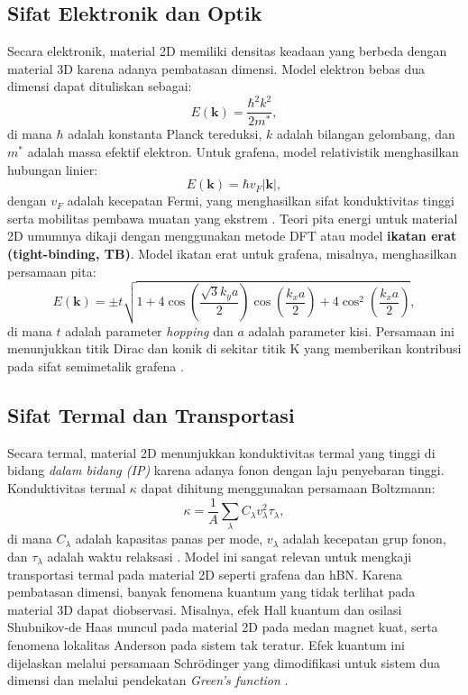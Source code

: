 \subsection{Sifat Elektronik dan Optik}
Secara elektronik, material 2D memiliki densitas keadaan yang berbeda dengan material 3D karena adanya pembatasan dimensi.
Model elektron bebas dua dimensi dapat dituliskan sebagai:
\begin{equation}
    E(\mathbf{k}) = \frac{\hbar^2 k^2}{2m^*},
\end{equation}
di mana \( \hbar \) adalah konstanta Planck tereduksi, \( k \) adalah bilangan gelombang, dan \( m^* \) adalah massa efektif elektron.
Untuk grafena, model relativistik menghasilkan hubungan linier:
\begin{equation}
    E(\mathbf{k}) = \hbar v_F |\mathbf{k}|,
\end{equation}
dengan \( v_F \) adalah kecepatan Fermi, yang menghasilkan sifat konduktivitas tinggi serta mobilitas pembawa muatan yang ekstrem \citep{Novoselov2004,CastroNeto2009}.
Teori pita energi untuk material 2D umumnya dikaji dengan menggunakan metode DFT atau model \textbf{ikatan erat (tight-binding, TB)}.
Model ikatan erat untuk grafena, misalnya, menghasilkan persamaan pita:
\begin{equation}
    E(\mathbf{k}) = \pm t \sqrt{1 + 4\cos\left(\frac{\sqrt{3}k_y a}{2}\right)\cos\left(\frac{k_x a}{2}\right) + 4\cos^2\left(\frac{k_x a}{2}\right)},
\end{equation}
di mana \( t \) adalah parameter \emph{hopping} dan \( a \) adalah parameter kisi.
Persamaan ini menunjukkan titik Dirac dan konik di sekitar titik K yang memberikan kontribusi pada sifat semimetalik grafena \citep{CastroNeto2009}.

\subsection{Sifat Termal dan Transportasi}
Secara termal, material 2D menunjukkan konduktivitas termal yang tinggi di bidang \emph{dalam bidang (IP)} karena adanya fonon dengan laju penyebaran tinggi.
Konduktivitas termal \(\kappa\) dapat dihitung menggunakan persamaan Boltzmann:
\begin{equation}
    \kappa = \frac{1}{A} \sum_{\lambda} C_{\lambda} v_{\lambda}^2 \tau_{\lambda},
\end{equation}
di mana \( C_{\lambda} \) adalah kapasitas panas per mode, \( v_{\lambda} \) adalah kecepatan grup fonon, dan \( \tau_{\lambda} \) adalah waktu relaksasi \citep{Das2015}.
Model ini sangat relevan untuk mengkaji transportasi termal pada material 2D seperti grafena dan hBN.
Karena pembatasan dimensi, banyak fenomena kuantum yang tidak terlihat pada material 3D dapat diobservasi.
Misalnya, efek Hall kuantum dan osilasi Shubnikov-de Haas muncul pada material 2D pada medan magnet kuat, serta fenomena lokalitas Anderson pada sistem tak teratur.
Efek kuantum ini dijelaskan melalui persamaan Schrödinger yang dimodifikasi untuk sistem dua dimensi dan melalui pendekatan \emph{Green’s function} \citep{ando2002}.


